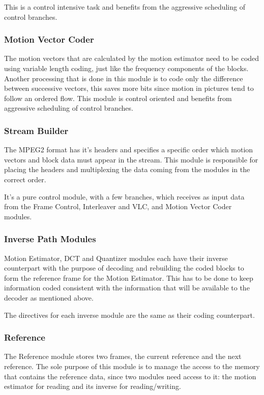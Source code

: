 \documentclass[a4paper, 12pt]{article}
\begin{document}
	This is a control intensive task and benefits from the aggressive scheduling of control branches.

\subsubsection{Motion Vector Coder}
	The motion vectors that are calculated by the motion estimator need to be coded using variable length coding, just like the frequency components of the blocks. Another processing that is done in this module is to code only the difference between successive vectors, this saves more bits since motion in pictures tend to follow an ordered flow. This module is control oriented and benefits from aggressive scheduling of control branches.

\subsubsection{Stream Builder}
	The MPEG2 format has it's headers and specifies a specific order which motion vectors and block data must appear in the stream. This module is responsible for placing the headers and multiplexing the data coming from the modules in the correct order. 
	
	It's a pure control module, with a few branches, which receives as input data from the Frame Control, Interleaver and VLC, and Motion Vector Coder modules.

\subsubsection{Inverse Path Modules}
	Motion Estimator, DCT and Quantizer modules each have their inverse counterpart with the purpose of decoding and rebuilding the coded blocks to form the reference frame for the Motion Estimator. This has to be done to keep information coded consistent with the information that will be available to the decoder as mentioned above. 
	
	The directives for each inverse module are the same as their coding counterpart.

\subsubsection{Reference}
	The Reference module stores two frames, the current reference and the next reference. The sole purpose of this module is to manage the access to the memory that contains the reference data, since two modules need access to it: the motion estimator for reading and its inverse for reading/writing.
\end{document}
